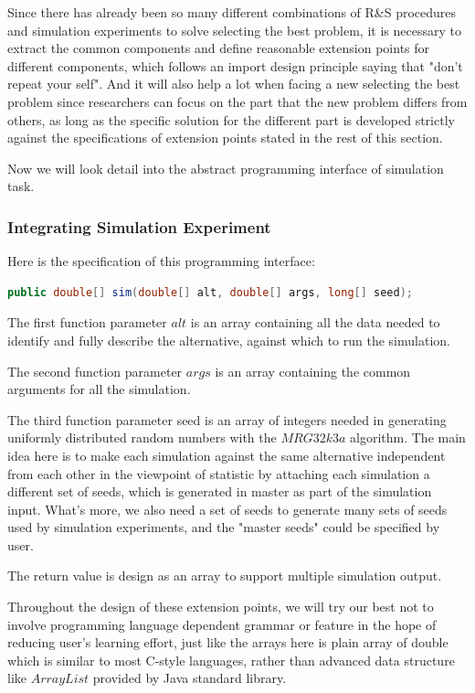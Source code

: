 Since there has already been so many different combinations of R\&S procedures and simulation experiments to solve selecting the best problem, it is necessary to extract the common components and define reasonable extension points for different components, which follows an import design principle saying that "don't repeat your self". And it will also help a lot when facing a new selecting the best problem since researchers can focus on the part that the new problem differs from others, as long as the specific solution for the different part is developed strictly against the specifications of extension points stated in the rest of this section.

Now we will look detail into the abstract programming interface of simulation task.

\subsubsection{Integrating Simulation Experiment}

Here is the specification of this programming interface:

\begin{lstlisting}[language=Java]
public double[] sim(double[] alt, double[] args, long[] seed);
\end{lstlisting}

The first function parameter $alt$ is an array containing all the data needed to identify and fully describe the alternative, against which to run the simulation.

The second function parameter $args$ is an array containing the common arguments for all the simulation.

The third function parameter seed is an array of integers needed in generating uniformly distributed random numbers with the $MRG32k3a$ algorithm. The main idea here is to make each simulation against the same alternative independent from each other in the viewpoint of statistic by attaching each simulation a different set of seeds, which is generated in master as part of the simulation input. What's more, we also need a set of seeds to generate many sets of seeds used by simulation experiments, and the "master seeds" could be specified by user.

The return value is design as an array to support multiple simulation output.

Throughout the design of these extension points, we will try our best not to involve programming language dependent grammar or feature in the hope of reducing user's learning effort, just like the arrays here is plain array of double which is similar to most C-style languages, rather than advanced data structure like $ArrayList$ provided by Java standard library.

